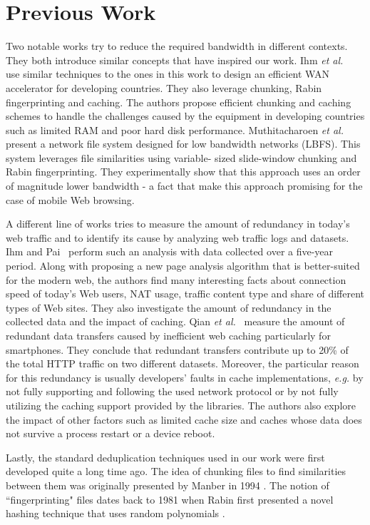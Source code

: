 \section{Previous Work}\label{sec:rel_work}
Two notable works try to reduce the required bandwidth in different contexts. They both introduce similar concepts that have
inspired our work. Ihm \textit{et al.}~\cite{wanax} use similar techniques to the ones in this work to design an efficient WAN accelerator for developing countries. They also leverage chunking, Rabin fingerprinting and caching. 
The authors propose efficient chunking and caching schemes to handle the challenges caused by the equipment in developing countries such as limited RAM and poor hard disk performance. Muthitacharoen \textit{et al.}~\cite{lbfs} present a network file system designed for low bandwidth networks (LBFS). This system leverages file similarities using variable-
sized slide-window chunking and Rabin fingerprinting. They experimentally show that this approach uses an order of
magnitude lower bandwidth - a fact that make this approach promising for the case of mobile Web browsing.

A different line of works tries to measure the amount of redundancy in today's web traffic and to identify its cause by
analyzing web traffic logs and datasets. Ihm and Pai~\cite{modern_web_traffic} perform such an analysis %
with data collected over a five-year period. Along with proposing a new page analysis algorithm 
that is better-suited for the modern web, the authors find many interesting facts about connection speed of today's Web users, NAT usage, traffic content type and share of different types of Web sites. They also investigate the amount of redundancy in the collected data and the impact of caching. 
Qian \textit{et al.}~\cite{web_caching} measure the 
amount of redundant data transfers caused by inefficient web caching particularly for smartphones. They conclude that redundant transfers contribute up to 20\% of the total HTTP traffic on two different datasets. Moreover, the particular reason for this redundancy is usually developers' faults in cache implementations, \textit{e.g.} by not fully supporting and following the used network protocol or by not fully utilizing the caching support provided by the libraries. The authors also explore the impact of other factors such as limited cache size and caches whose data does not survive a process restart or a device reboot.

Lastly, the standard deduplication techniques used in our work were first developed quite a long time ago. The idea of chunking files to find 
similarities between them was originally presented by Manber in 1994 \cite{manber}. The notion of ``fingerprinting" 
files dates back to 1981 when Rabin first presented a novel hashing technique that uses random polynomials \cite{rabin}.
